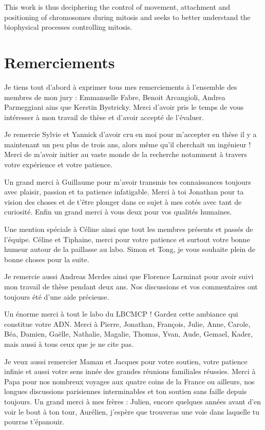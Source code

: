 \documentclass[12pt,a4paper,twoside,openright]{book}
\begin{document}
This work is thus deciphering the control of movement, attachment and
positioning of chromosomes during mitosis and seeks to better understand
the biophysical processes controlling mitosis.

\cleardoublepage

\section*{Remerciements}

Je tiens tout d'abord à exprimer tous mes remerciements à l'ensemble des
membres de mon jury : Emmanuelle Fabre, Benoit Arcangioli, Andrea
Parmeggiani ains que Kerstin Bystricky. Merci d'avoir pris le temps de
vous intéresser à mon travail de thèse et d'avoir accepté de l'évaluer.

Je remercie Sylvie et Yannick d'avoir cru en moi pour m'accepter en
thèse il y a maintenant un peu plus de trois ans, alors même qu'il
cherchait un ingénieur ! Merci de m'avoir initier au vaste monde de la
recherche notamment à travers votre expérience et votre patience.

Un grand merci à Guillaume pour m'avoir transmis tes connaissances
toujours avec plaisir, passion et ta patience infatigable. Merci à toi
Jonathan pour ta vision des choses et de t'être plonger dans ce sujet à
mes cotés avec tant de curiosité. Enfin un grand merci à vous deux pour
vos qualités humaines.

Une mention spéciale à Céline ainsi que tout les membres présents et
passés de l'équipe. Céline et Tiphaine, merci pour votre patience et
surtout votre bonne humeur autour de la paillasse au labo. Simon et
Tong, je vous souhaite plein de bonne choses pour la suite.

Je remercie aussi Andreas Merdes ainsi que Florence Larminat pour avoir
suivi mon travail de thèse pendant deux ans. Nos discussions et vos
commentaires ont toujours été d'une aide précieuse.

Un énorme merci à tout le labo du LBCMCP ! Gardez cette ambiance qui
constitue votre ADN. Merci à Pierre, Jonathan, François, Julie, Anne,
Carole, Béa, Damien, Gaëlle, Nathalie, Magalie, Thomas, Yvan, Aude,
Gemael, Kader, mais aussi à tous ceux que je ne cite pas.

Je veux aussi remercier Maman et Jacques pour votre soutien, votre
patience infinie et aussi votre sens innée des grandes réunions
familiales réussies. Merci à Papa pour nos nombreux voyages aux quatre
coins de la France ou ailleurs, nos longues discussions parisiennes
interminables et ton soutien sans faille depuis toujours. Un grand merci
à mes frères : Julien, encore quelques années avant d'en voir le bout à
ton tour, Aurélien, j'espère que trouveras une voie dans laquelle tu
pourras t'épanouir.
\end{document}
